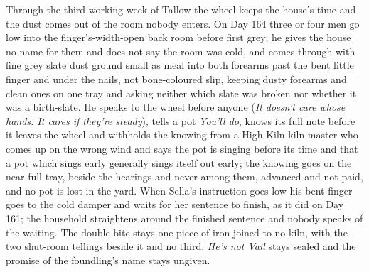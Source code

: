 \documentclass{design/chronicle}
\begin{document}
{Through the third working week of Tallow the wheel keeps the house’s time and the dust comes out of the room nobody enters. On Day 164 three or four men go low into the finger’s-width-open back room before first grey; he gives the house no name for them and does not say the room was cold, and comes through with fine grey slate dust ground small as meal into both forearms past the bent little finger and under the nails, not bone-coloured slip, keeping dusty forearms and clean ones on one tray and asking neither which slate was broken nor whether it was a birth-slate. He speaks to the wheel before anyone (\emph{It doesn’t care whose hands. It cares if they’re steady}), tells a pot \emph{You’ll do}, knows its full note before it leaves the wheel and withholds the knowing from a High Kiln kiln-master who comes up on the wrong wind and says the pot is singing before its time and that a pot which sings early generally sings itself out early; the knowing goes on the near-full tray, beside the hearings and never among them, advanced and not paid, and no pot is lost in the yard. When Sella’s instruction goes low his bent finger goes to the cold damper and waits for her sentence to finish, as it did on Day 161; the household straightens around the finished sentence and nobody speaks of the waiting. The double bite stays one piece of iron joined to no kiln, with the two shut-room tellings beside it and no third. \emph{He’s not Vail} stays sealed and the promise of the foundling’s name stays ungiven.

}
\end{document}
